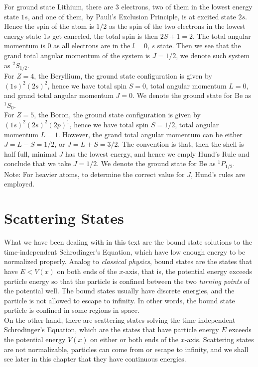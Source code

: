 \documentclass[11pt]{book}
\theoremstyle{break}
\theoremstyle{break}
\newcommand{\note}{\color{red}Note: \color{black}}
\begin{document}
For ground state Lithium, there are $3$ electrons, two of them in the lowest energy state $1s$, and one of them, by Pauli's Exclusion Principle, is at excited state $2s$. Hence the spin of the atom is $1/2$ as the spin of the two electrons in the lowest energy state $1s$ get canceled, the total spin is then $2S+ 1 = 2$. The total angular momentum is $0$ as all electrons are in the $l=0$, $s$ state. Then we see that the grand total angular momentum of the system is $J = 1/2$, we denote such system as $^2S_{1/2}$. \\


For $Z = 4$, the Beryllium, the ground state configuration is given by $(1s)^2(2s)^2$, hence we have total spin $S = 0$, total angular momentum $L=0$, and grand total angular momentum $J = 0$. We denote the ground state for Be as $^1S_0$.\\

For $Z = 5$, the Boron, the ground state configuration is given by $(1s)^2(2s)^2(2p)^1$, hence we have total spin $S = 1/2$, total angular momentum $L=1$. However, the grand total angular momentum can be either $J = L-S = 1/2$, or $J =L+S = 3/2$. The convention is that, then the shell is half full, minimal $J$ has the lowest energy, and hence we emply Hund's Rule and conclude that we take $J = 1/2$. We denote the ground state for Be as $^1P_{1/2}$.\\

\note For heavier atoms, to determine the correct value for $J$, Hund's rules are employed.

\chapter{Scattering States}

What we have been dealing with in this text are the bound state solutions to the time-independent Schrodinger's Equation, which have low enough energy to be normalized properly. Analog to \textit{classical physics}, bound states are the states that have $E<V(x)$ on both ends of the $x$-axis, that is, the potential energy exceeds particle energy so that the particle is confined between the two \textit{turning points} of the potential well. The bound states usually have discrete energies, and the particle is not allowed to escape to infinity. In other words, the bound state particle is confined in some regions in space.\\

On the other hand, there are scattering states solving the time-independent Schrodinger's Equation, which are the states that have particle energy $E$ exceeds the potential energy $V(x)$ on either or both ends of the $x$-axis. Scattering states are not normalizable, particles can come from or escape to infinity, and we shall see later in this chapter that they have continuous energies. \\
\end{document}
